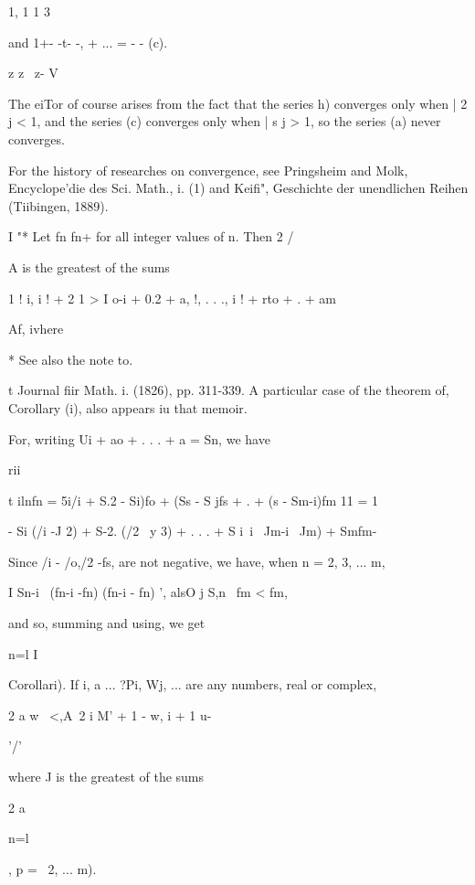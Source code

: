 1, 1 1 3

and 1+- -t- -, + ... = - - (c).

z z~ z- V

The eiTor of course arises from the fact that the series h) converges
only when | 2 j < 1, and the series (c) converges only when | s j > 1,
so the series (a) never converges.

For the history of researches on convergence, see Pringsheim and Molk,
Encyclope'die des Sci. Math., i. (1) and Keifi", Geschichte der
unendlichen Reihen (Tiibingen, 1889).


I "* Let fn fn+ for all integer values of n. Then 2 /

A is the greatest of the sums

1 ! i, i ! + 2 1 > I o-i + 0.2 + a, !, . . ., i ! + rto +   . + am

  Af, ivhere

* See also the note to.

t Journal fiir Math. i. (1826), pp. 311-339. A particular case of the
theorem of, Corollary (i), also appears iu that memoir.

%
%

For, writing Ui + ao + . . . + a = Sn, we have

rii

t ilnfn = 5i/i + S.2 - Si)fo + (Ss - S jfs + . + (s - Sm-i)fm 11 = 1

- Si (/i -J 2) + S-2. (/2 ~y 3) + . . . + S i\ i \ Jm-i ~Jm) + Smfm-

Since /i - /o,/2 -fs,  are not negative, we have, when n = 2, 3,
... m,

I Sn-i \ (fn-i -fn) (fn-i - fn) ', alsO j S,n \ fm < fm,

and so, summing and using, we get

n=l I

Corollari). If i, a ... ?Pi, Wj, ... are any numbers, real or complex,

2 a w \ <,A\ 2 i M' + 1 - w, i + 1 u-

'/'

where J is the greatest of the sums

2 a

n=l

, p = \, 2, ... m).



